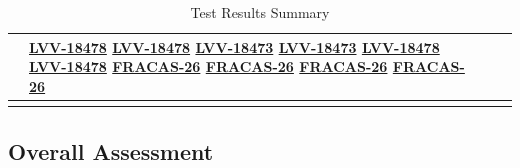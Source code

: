 \documentclass[SE,lsstdraft,STR,toc]{lsstdoc}
\begin{document}
\begin{longtable}{p{2cm}p{2.5cm}p{9cm}p{2.5cm}}
\begin{minipage}[]{9cm}
    \medskip
    \end{minipage}
    &
          \href{https://jira.lsstcorp.org/browse/LVV-18478}{LVV-18478}
          \href{https://jira.lsstcorp.org/browse/LVV-18478}{LVV-18478}
          \href{https://jira.lsstcorp.org/browse/LVV-18473}{LVV-18473}
          \href{https://jira.lsstcorp.org/browse/LVV-18473}{LVV-18473}
          \href{https://jira.lsstcorp.org/browse/LVV-18478}{LVV-18478}
          \href{https://jira.lsstcorp.org/browse/LVV-18478}{LVV-18478}
          \href{https://jira.lsstcorp.org/browse/FRACAS-26}{FRACAS-26}
          \href{https://jira.lsstcorp.org/browse/FRACAS-26}{FRACAS-26}
          \href{https://jira.lsstcorp.org/browse/FRACAS-26}{FRACAS-26}
          \href{https://jira.lsstcorp.org/browse/FRACAS-26}{FRACAS-26}
    \\\hline
\caption{Test Results Summary}
\label{table:summary}
\end{longtable}

\subsection{Overall Assessment}
\label{sect:overallassessment}
\end{document}

